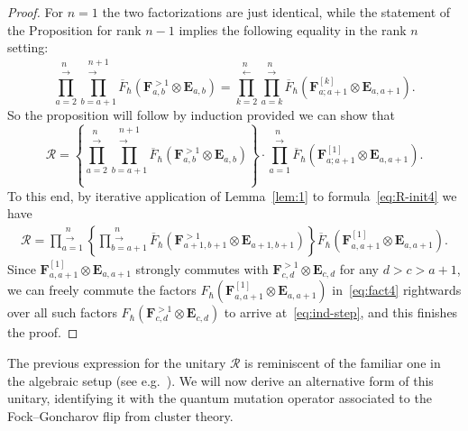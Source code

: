 \documentclass[11pt, reqno]{amsart}
\theoremstyle{definition}
\numberwithin{equation}{section}
\def\beq{\begin{equation}}
\def\eeq{\end{equation}}
\newcommand{\hr}[1]{\left(#1\right)}                                                    %
\newcommand{\hc}[1]{\left\{#1\right\}}                                                  %
\def\Rc{\mathcal R}
\def\stgE{\mathbf{E}}
\def\stgF{\mathbf{F}}
\begin{document}
\begin{proof}
 For $n=1$ the two factorizations are just identical, while the statement of the Proposition for rank $n-1$ implies the following equality in the rank $n$ setting:
$$
\prod_{a=2}^{\substack{n \\[-2pt] \longrightarrow}} \prod_{b=a+1}^{\substack{n +1\\[-2pt] \longrightarrow}} \overline F_\hbar\hr{\stgF^{>1}_{a,b} \otimes \stgE_{a,b}} = \prod_{k=2}^{\substack{n \\[-2pt] \longleftarrow}} \prod_{a=k}^{\substack{n \\[-2pt] \longrightarrow}}\overline F_\hbar\hr{\stgF_{a;a+1}^{[k]} \otimes \stgE_{a,a+1}}.
$$
So the proposition will follow by induction provided we can show that
\beq
\label{eq:ind-step}
\Rc = \hc{\prod_{a=2}^{\substack{n \\[-2pt] \longrightarrow}} \prod_{b=a+1}^{\substack{n+1 \\[-2pt] \longrightarrow}} \overline F_\hbar\hr{\stgF^{>1}_{a,b} \otimes \stgE_{a,b}} } \cdot \prod_{a=1}^{\substack{n \\[-2pt] \longrightarrow}} \overline F_\hbar\hr{\stgF_{a;a+1}^{[1]} \otimes \stgE_{a,a+1}}.
\eeq
To this end, by iterative application of Lemma~\ref{lem:1} to formula~\eqref{eq:R-init4} we have
\begin{align}
\label{eq:fact4}
\Rc = \prod_{a=1}^{\substack{n \\[-2pt] \longrightarrow}} \hc{\prod_{b=a+1}^{\substack{n \\[-2pt] \longrightarrow}} \overline F_\hbar\hr{\stgF_{a+1,b+1}^{>1} \otimes \stgE_{a+1,b+1}}} \overline F_\hbar\hr{\stgF_{a,a+1}^{[1]} \otimes \stgE_{a,a+1}}.
\end{align}
Since $\stgF_{a,a+1}^{[1]}\otimes \stgE_{a,a+1}$ strongly commutes with $\stgF_{c,d}^{>1}\otimes \stgE_{c,d}$ for any $d>c>a+1$, we 
can freely commute the factors $F_\hbar\hr{\stgF_{a,a+1}^{[1]} \otimes \stgE_{a,a+1}}$ in~\eqref{eq:fact4} rightwards over all such factors $F_\hbar\hr{\stgF_{c,d}^{>1}\otimes \stgE_{c,d}}$ to  arrive at~\eqref{eq:ind-step}, and this finishes the proof.
\end{proof}








The previous expression for the unitary $\mathcal{R}$ is reminiscent of the  familiar one in the algebraic setup (see e.g.\ \cite[Section 8.3.2]{KS97}).  We will now derive an alternative form of this unitary, identifying it with the quantum mutation operator associated to the Fock--Goncharov flip from cluster theory.
\end{document}
